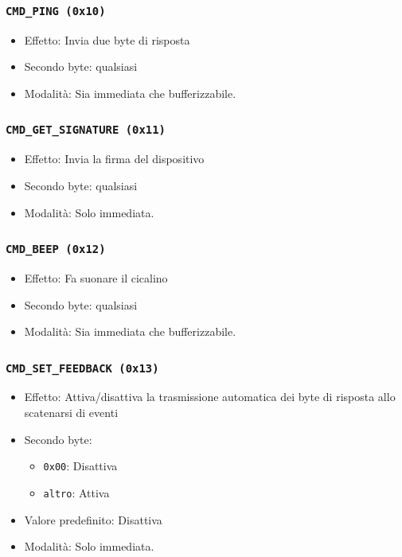 \subsubsection{\texttt{CMD\_PING (0x10)}}
\begin{itemize}
	\item Effetto: Invia due byte di risposta
	\item Secondo byte: qualsiasi
	\item Modalit\`a: Sia immediata che bufferizzabile.
\end{itemize}

\subsubsection{\texttt{CMD\_GET\_SIGNATURE (0x11)}}
\begin{itemize}
	\item Effetto: Invia la firma del dispositivo
	\item Secondo byte: qualsiasi
	\item Modalit\`a: Solo immediata.
\end{itemize}

\subsubsection{\texttt{CMD\_BEEP (0x12)}}
\begin{itemize}
	\item Effetto: Fa suonare il cicalino
	\item Secondo byte: qualsiasi
	\item Modalit\`a: Sia immediata che bufferizzabile.
\end{itemize}

\subsubsection{\texttt{CMD\_SET\_FEEDBACK (0x13)}}
\begin{itemize}
	\item Effetto: Attiva/disattiva la trasmissione automatica dei byte di risposta allo scatenarsi di eventi
	\item Secondo byte:
	\begin{itemize}
		\item \texttt{0x00}: Disattiva
		\item \texttt{altro}: Attiva
	\end{itemize}
	\item Valore predefinito: Disattiva
	\item Modalit\`a: Solo immediata.
\end{itemize}


